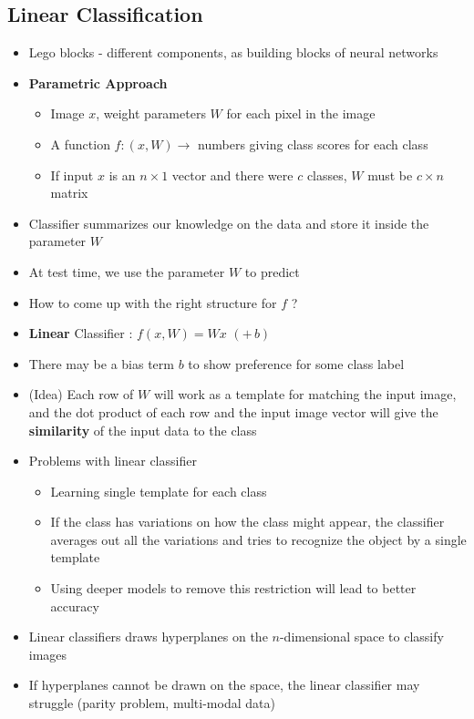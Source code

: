 \subsection{Linear Classification}
\begin{itemize}
	\item Lego blocks - different components, as building blocks of neural networks
	\item \textbf{Parametric Approach}
	\begin{itemize}
		\item Image $x$, weight parameters $W$ for each pixel in the image
		\item A function $f : (x, W) \rightarrow$ numbers giving class scores for each class
		\item If input $x$ is an $n\times 1$ vector and there were $c$ classes, $W$ must be $c\times n$ matrix
	\end{itemize}
	\item Classifier summarizes our knowledge on the data and store it inside the parameter $W$
	\item At test time, we use the parameter $W$ to predict
	\item How to come up with the right structure for $f$ ?
	\item \textbf{Linear} Classifier : $f(x, W) = Wx$ $(+\, b)$
	\item There may be a bias term $b$ to show preference for some class label
	\item (Idea) Each row of $W$ will work as a template for matching the input image, and the dot product of each row and the input image vector will give the \textbf{similarity} of the input data to the class
	\item Problems with linear classifier
	\begin{itemize}
		\item Learning single template for each class
		\item If the class has variations on how the class might appear, the classifier averages out all the variations and tries to recognize the object by a single template
		\item Using deeper models to remove this restriction will lead to better accuracy
	\end{itemize}
	\item Linear classifiers draws hyperplanes on the $n$-dimensional space to classify images
	\item If hyperplanes cannot be drawn on the space, the linear classifier may struggle (parity problem, multi-modal data)
\end{itemize}























